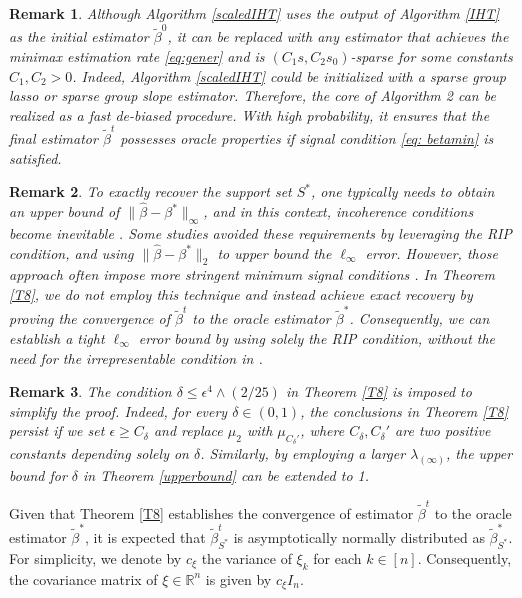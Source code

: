 \documentclass[12pt]{article}
\newtheorem{remark}{Remark}
\begin{document}
\begin{remark}
    Although Algorithm \ref{scaledIHT} uses the output of Algorithm \ref{IHT} as the initial estimator $\tilde \beta^0$, it can be replaced with any estimator that achieves the minimax estimation rate \eqref{eq:gener} and is $(C_1s, C_2s_0)$-sparse for some constants $C_1, C_2 > 0$. 
    Indeed, Algorithm \ref{scaledIHT} could be initialized with a sparse group lasso \cite{CZ22} or sparse group slope \cite{LZ23} estimator.  
Therefore, the core of Algorithm 2 can be realized as a fast de-biased procedure. 
With high probability, it ensures that the final estimator $\tilde \beta^t$ possesses oracle properties if signal condition \eqref{eq: betamin} is satisfied.
\end{remark}

\begin{remark}
To exactly recover the support set $S^*$, one typically needs to obtain an upper bound of $\| \hat \beta - \beta^*\|_{\infty}$, and in this context, incoherence conditions become inevitable \cite{JMLR:v7:zhao06a}.
Some studies avoided these requirements by leveraging the RIP condition, and using $\| \hat \beta - \beta^*\|_2$ to upper bound the $\ell_{\infty}$ error. 
However, those approach often impose more stringent minimum signal conditions \cite{yuan18grad, Huang18}.
In Theorem \ref{T8}, we do not employ this technique and instead achieve exact recovery by proving the convergence of $\tilde \beta^t$ to the oracle estimator $\tilde \beta^*$. Consequently, we can establish a tight $\ell_\infty$ error bound by using solely the RIP condition, without the need for the irrepresentable condition in \cite{CZ22}.
\end{remark}

\begin{remark}
The condition $\delta\le \epsilon^4 \wedge (2/25)$ in Theorem \ref{T8} is imposed to simplify the proof. 
Indeed, for every $\delta \in (0,1)$, the conclusions in Theorem \ref{T8} persist if we set $\epsilon \geq C_\delta$ and replace $\mu_2$ with $\mu_{C_\delta'}$, where $C_\delta, C_\delta'$ are two positive constants depending solely on $\delta$.
Similarly, by employing a larger $\lambda_{(\infty)}$, the upper bound for $\delta$ in Theorem \ref{upperbound} can be extended to 1.
\end{remark}


Given that Theorem \ref{T8} establishes the convergence of estimator $\tilde \beta^t$ to the oracle estimator $\tilde \beta^*$, it is expected that $\tilde \beta^t_{S^*}$ is asymptotically normally distributed as $\tilde \beta^*_{S^*}$. 
For simplicity, we denote by $c_\xi$ the variance of $\xi_k$ for each $k \in [n]$. Consequently, the covariance matrix of $\xi \in \mathbb{R}^n$ is given by $c_\xi I_n$.
\end{document}
